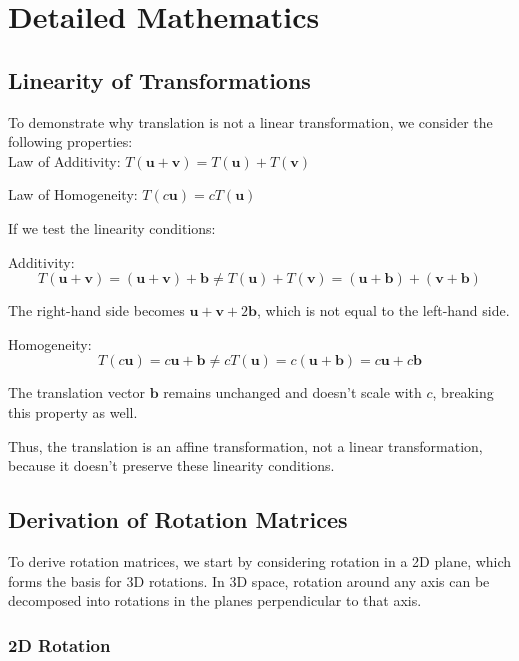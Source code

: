 \documentclass[12pt]{article}
\begin{document}
\appendix
\section{Detailed Mathematics}
\label{sec:appendix-derivations}

\subsection{Linearity of Transformations}
\label{sec:appendix-derivations-linear}
To demonstrate why translation is not a linear transformation, we consider the following properties: \\

Law of Additivity: \( T(\mathbf{u} + \mathbf{v}) = T(\mathbf{u}) + T(\mathbf{v}) \)

Law of Homogeneity: \( T(c\mathbf{u}) = cT(\mathbf{u}) \)

If we test the linearity conditions:

Additivity:
\[
    T(\mathbf{u} + \mathbf{v}) = (\mathbf{u} + \mathbf{v}) + \mathbf{b} \neq T(\mathbf{u}) + T(\mathbf{v}) = (\mathbf{u} + \mathbf{b}) + (\mathbf{v} + \mathbf{b})
\]

The right-hand side becomes \( \mathbf{u} + \mathbf{v} + 2\mathbf{b} \), which is not equal to the left-hand side.

Homogeneity:
\[
    T(c\mathbf{u}) = c\mathbf{u} + \mathbf{b} \neq cT(\mathbf{u}) = c(\mathbf{u} + \mathbf{b}) = c\mathbf{u} + c\mathbf{b}
\]

The translation vector \( \mathbf{b} \) remains unchanged and doesn’t scale with \( c \), breaking this property as well.

Thus, the translation is an affine transformation, not a linear transformation, because it doesn’t preserve these linearity conditions.

\subsection{Derivation of Rotation Matrices}
\label{sec:appendix-derivations-rotation}

To derive rotation matrices, we start by considering rotation in a 2D plane, which forms the basis for 3D rotations. In 3D space, rotation around any axis can be decomposed into rotations in the planes perpendicular to that axis.

\subsubsection{2D Rotation}
\end{document}
